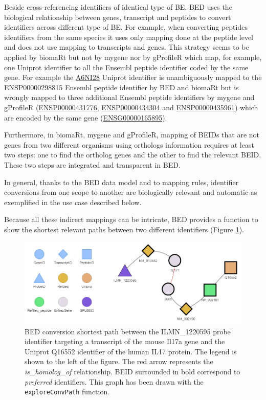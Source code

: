\documentclass[9pt,a4paper,]{extarticle}
\theoremstyle{definition}
\theoremstyle{definition}
\theoremstyle{definition}
\theoremstyle{remark}
\begin{document}
Beside cross-referencing identifiers of identical type of BE,
BED uses the biological relationship between genes, transcript and peptides
to convert identifiers across different type of BE.
For example, when converting peptides identifiers from the same species
it uses only mapping done at the peptide level and does not use mapping
to transcripts and genes. This strategy seems to be applied by biomaRt
but not by mygene nor by gProfileR which map, for example,
one Uniprot identifier
to all the Ensembl peptide identifier coded by the same gene.
For example
the \href{http://www.uniprot.org/uniprot/A6NI28}{A6NI28} Uniprot identifier
is unambiguously mapped to the
ENSP00000298815 Ensembl peptide identifier by BED and biomaRt but is
wrongly mapped to
three additional Ensembl peptide identifiers by mygene and gProfileR
(\href{http://www.ensembl.org/id/ENSP00000431776}{ENSP00000431776},
\href{http://www.ensembl.org/id/ENSP00000434304}{ENSP00000434304}
and \href{http://www.ensembl.org/id/ENSP00000435961}{ENSP00000435961})
which are encoded by
the same gene (\href{http://www.ensembl.org/id/ENSG00000165895}{ENSG00000165895}).

Furthermore, in biomaRt, mygene and gProfileR, mapping of BEIDs that are not
genes from two different organisms using orthologs information requires at
least two steps: one to find the ortholog genes and the other to find the
relevant BEID.
These two steps are integrated and transparent in BED.

In general, thanks to the BED data model and to mapping rules,
identifier conversions from one scope to another are biologically
relevant and automatic as exemplified in the use case described below.

Because all these indirect mappings can be intricate,
BED provides a function to show the shortest relevant paths between
two different identifiers (Figure \ref{fig:explConv}).

\begin{figure}

{\centering \includegraphics[width=1\linewidth]{img/ILMN_1220595-Conversion} 

}

\caption{BED conversion shortest path between the ILMN\_1220595 probe identifier targeting a transcript of the mouse Il17a gene and the Uniprot Q16552 identifier of the human IL17 protein. The legend is shown to the left of the figure. The red arrow represents the \emph{is\_homolog\_of} relationship. BEID surrounded in bold correspond to \emph{preferred} identifiers. This graph has been drawn with the \texttt{exploreConvPath} function.}\label{fig:explConv}
\end{figure}
\end{document}
